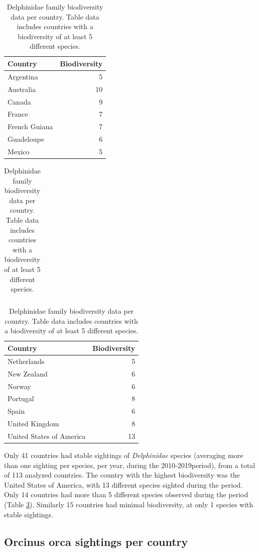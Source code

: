 \documentclass[10pt,letterpaper]{article}
\begin{document}
\begin{table}
\caption{\label{tab:unnamed-chunk-5}\label{table:country_div} Delphinidae family biodiversity data per country. Table data includes countries with a biodiversity of at least 5 different species.}

\centering
\begin{tabular}{l|r}
\hline
Country & Biodiversity\\
\hline
Argentina & 5\\
\hline
Australia & 10\\
\hline
Canada & 9\\
\hline
France & 7\\
\hline
French Guiana & 7\\
\hline
Guadeloupe & 6\\
\hline
Mexico & 5\\
\hline
\end{tabular}
\centering
\begin{tabular}{r}
\hline

\hline
\end{tabular}
\centering
\begin{tabular}{l|r}
\hline
Country & Biodiversity\\
\hline
Netherlands & 5\\
\hline
New Zealand & 6\\
\hline
Norway & 6\\
\hline
Portugal & 8\\
\hline
Spain & 6\\
\hline
United Kingdom & 8\\
\hline
United States of America & 13\\
\hline
\end{tabular}
\end{table}

Only 41 countries had stable sightings of \emph{Delphinidae} species
(averaging more than one sighting per species, per year, during the
2010-2019period), from a total of 113 analyzed countries. The country
with the highest biodiversity was the United States of America, with 13
different species sighted during the period. Only 14 countries had more
than 5 different species observed during the period (Table
\ref{table:country_div}). Similarly 15 countries had minimal
biodiversity, at only 1 species with stable sightings.

\hypertarget{orcinus-orca-sightings-per-country}{%
\subsection{Orcinus orca sightings per
country}\label{orcinus-orca-sightings-per-country}}
\end{document}
